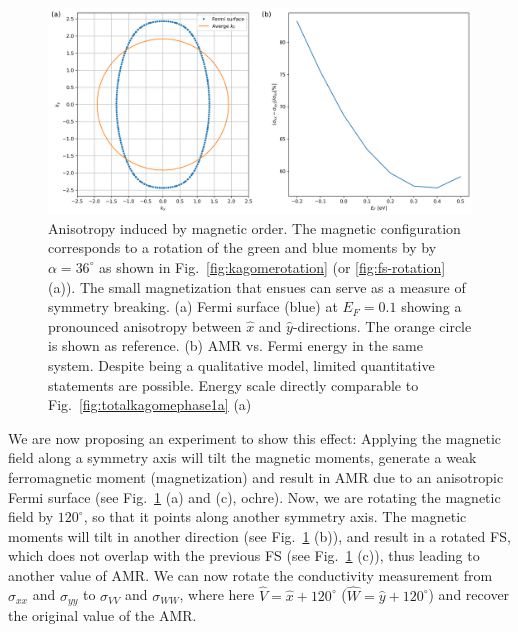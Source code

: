 \documentclass[prb,showpacs,amsmath,amssymb,superscriptaddress,twocolumn,floatfix]{revtex4-1}
\begin{document}
\begin{figure}
	\centering
	\includegraphics[width=\linewidth]{img/fig4_new}
	\caption{Anisotropy induced by magnetic order. The magnetic configuration corresponds to a rotation of the green and blue moments by by~$\alpha = 36^\circ$ as shown in Fig.~\ref{fig:kagomerotation} (or \ref{fig:fs-rotation} (a)). The small magnetization that ensues can serve as a measure of symmetry breaking. 		
	(a) Fermi surface (blue) at $E_F = 0.1$ showing a pronounced anisotropy between $\hat{x}$ and $\hat{y}$-directions. The orange circle is shown as reference.	
	(b) AMR vs. Fermi energy in the same system. Despite being a qualitative model, limited quantitative statements are possible. Energy scale directly comparable to Fig.~\ref{fig:totalkagomephase1a} (a)}
   \label{fig:asymmFS}
\end{figure}

We are now proposing an experiment to show this effect: Applying the magnetic field along a symmetry axis will tilt the magnetic moments, generate a weak ferromagnetic moment (magnetization) and result in AMR due to an anisotropic Fermi surface (see Fig.~\ref{fig:asymmFS} (a) and (c), ochre). Now, we are rotating the magnetic field by $120^\circ$, so that it points along another symmetry axis. The magnetic moments will tilt in another direction (see Fig.~\ref{fig:asymmFS} (b)), and result in a rotated FS, which does not overlap with the previous FS (see Fig.~\ref{fig:asymmFS} (c)), thus leading to another value of AMR. We can now rotate the conductivity measurement from $\sigma_{xx}$ and $\sigma_{yy}$ to $\sigma_{VV}$ and $\sigma_{WW}$, where here $\hat{V} = \hat{x} + 120^\circ$ ($\hat{W} = \hat{y} + 120^\circ$) and recover the original value of the AMR. 
\end{document}
